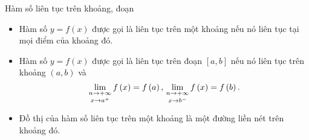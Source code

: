 \begin{dang}{Hàm số liên tục trên khoảng, đoạn}
	\begin{itemize}
		\item Hàm số $y=f(x)$ được gọi là liên tục trên một khoảng nếu nó liên tục tại mọi điểm của khoảng đó.
		\item Hàm số $y=f(x)$ được gọi là liên tục trên đoạn $[a,b]$ nếu nó liên tục trên khoảng $(a,b)$ và $$\mathop {\lim \limits_{n \to +\infty}}\limits_{x \to {a^ + }} f\left( x \right) = f\left( a \right),{\rm{   }}\mathop {\lim \limits_{n \to +\infty}}\limits_{x \to {b^ - }} f\left( x \right) = f\left( b \right).$$
		\item Đồ thị của hàm số liên tục trên một khoảng là một đường liền nét trên khoảng đó.
	\end{itemize}
\end{dang}
